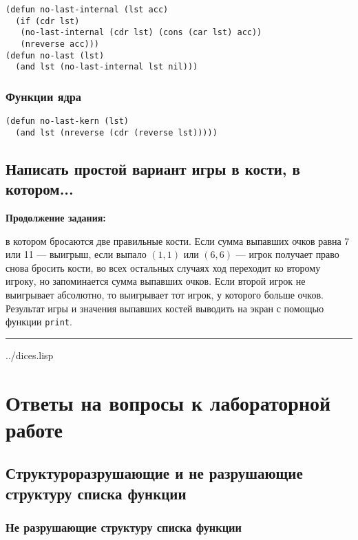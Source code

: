 \begin{lstlisting}
(defun no-last-internal (lst acc)
  (if (cdr lst)
   (no-last-internal (cdr lst) (cons (car lst) acc))
   (nreverse acc)))
(defun no-last (lst)
  (and lst (no-last-internal lst nil)))
\end{lstlisting}

\subsection{Функции ядра}

\begin{lstlisting}
(defun no-last-kern (lst)
  (and lst (nreverse (cdr (reverse lst)))))
\end{lstlisting}


\section{Написать простой вариант игры в кости, в котором...}

\textbf{Продолжение задания:}

в котором бросаются две правильные кости. Если сумма выпавших очков равна 7 или 11 --- выигрыш, если выпало $(1, 1)$ или $(6, 6)$ --- игрок получает право снова бросить кости, во всех остальных случаях ход переходит ко второму игроку, но запоминается сумма выпавших очков. Если второй игрок не выигрывает абсолютно, то выигрывает тот игрок, у которого больше очков. Результат игры и значения выпавших костей выводить на экран с помощью функции \texttt{print}.

\noindent\rule{12cm}{0.4pt}

\begin{lstinputlisting}[
        caption={Игра в кости},
        style={mystyle},
    ]{../dices.lisp}
\end{lstinputlisting}

\chapter{Ответы на вопросы к лабораторной работе}

\section{Структуроразрушающие и не разрушающие структуру списка функции}

\subsection{Не разрушающие структуру списка функции}

